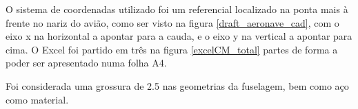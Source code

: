 \FloatBarrier
O sistema de coordenadas utilizado foi um referencial localizado na ponta mais à frente no nariz do avião, como ser visto na figura \ref{draft_aeronave_cad}, com o eixo x na horizontal a apontar para a cauda, e o eixo y na vertical a apontar para cima. O Excel foi partido em três na figura \ref{excelCM_total} partes de forma a poder ser apresentado numa folha A4.\par
Foi considerada uma grossura de 2.5 nas geometrias da fuselagem, bem como aço como material.